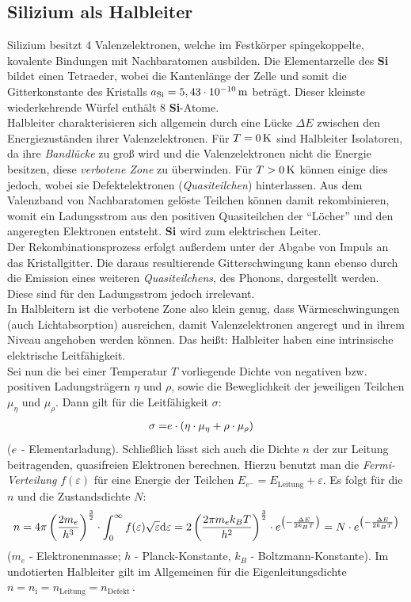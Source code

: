 \documentclass[numbers=noenddot,12pt,a4paper]{scrartcl}
\newcommand{\diff}{\textnormal{d}}
\newcommand{\ix}[1]{_\text{#1}}
\newcommand{\tilt}[1]{\textit{#1}}
\newcommand{\euler}{\mathnormal{e}}
\newcommand{\fett}[1]{\textbf{#1}}
\begin{document}
\subsection{Silizium als Halbleiter}
Silizium besitzt 4 Valenzelektronen, welche im Festkörper spingekoppelte, kovalente Bindungen mit Nachbaratomen ausbilden. Die Elementarzelle des \textbf{Si} bildet einen Tetraeder, wobei die Kantenlänge der Zelle und somit die Gitterkonstante des Kristalls $a\ix{Si}=\unit[5,43\cdot 10^{-10}]{m}$ beträgt. Dieser kleinste wiederkehrende Würfel enthält 8 \textbf{Si}-Atome.\\
Halbleiter charakterisieren sich allgemein durch eine Lücke $\Delta E$ zwischen den Energiezuständen ihrer Valenzelektronen. Für $T=\unit[0]{K}$ sind Halbleiter Isolatoren, da ihre \tilt{Bandlücke} zu groß wird und die Valenzelektronen nicht die Energie besitzen, diese \tilt{verbotene Zone} zu überwinden. Für $T>\unit[0]{K}$ können einige dies jedoch, wobei sie Defektelektronen (\tilt{Quasiteilchen}) hinterlassen. Aus dem Valenzband von Nachbaratomen gelöste Teilchen können damit rekombinieren, womit ein Ladungsstrom aus den positiven Quasiteilchen der "`Löcher"' und den angeregten Elektronen entsteht. \fett{Si} wird zum elektrischen Leiter.\\
Der Rekombinationsprozess erfolgt außerdem unter der Abgabe von Impuls an das Kristallgitter. Die daraus resultierende Gitterschwingung kann ebenso durch die Emission eines weiteren \tilt{Quasiteilchens}, des Phonons, dargestellt werden. Diese sind für den Ladungsstrom jedoch irrelevant.\\
In Halbleitern ist die verbotene Zone also klein genug, dass Wärmeschwingungen (auch Lichtabsorption) ausreichen, damit Valenzelektronen angeregt und in ihrem Niveau angehoben werden können. Das heißt: Halbleiter haben eine intrinsische  elektrische Leitfähigkeit.\\
Sei nun die bei einer Temperatur $T$ vorliegende Dichte von negativen bzw. positiven Ladungsträgern $\eta$ und $\rho$, sowie die Beweglichkeit der jeweiligen Teilchen $\mu_\eta$ und $\mu_\rho$. Dann gilt für die Leitfähigkeit $\sigma$:
\begin{align*}
    \sigma=&\mathnormal{e}\cdot\left(\eta\cdot\mu_\eta+\rho\cdot\mu_\rho\right)
\end{align*}
($\mathnormal{e}$ - Elementarladung). Schließlich lässt sich auch die Dichte $n$ der zur Leitung beitragenden, quasifreien Elektronen berechnen. Hierzu benutzt man die \tilt{Fermi-Verteilung} $f(\varepsilon)$ für eine Energie der Teilchen $E_{e^-}=E\ix{Leitung}+\varepsilon$. Es folgt für die $n$ und die Zustandsdichte $N$:
\begin{align*}
	n=4\pi\left(\frac{2m_e}{h^3}\right)^{\frac{3}{2}}\cdot \int_{0}^{\infty}f(\varepsilon)\sqrt{\varepsilon}\diff\varepsilon=2\left(\frac{2\pi m_e k_B T}{h^2}\right)^{\frac{3}{2}}\cdot\euler^{\left(-\frac{\Delta E}{2k_B T}\right)}=N\cdot\euler^{\left(-\frac{\Delta E}{2k_B T}\right)}
\end{align*}
($m_e$ - Elektronenmasse; $h$ - Planck-Konstante, $k_B$ - Boltzmann-Konstante). Im undotierten Halbleiter gilt im Allgemeinen für die Eigenleitungsdichte $n=n\ix{i}=n\ix{Leitung}=n\ix{Defekt}\,$.
\end{document}
